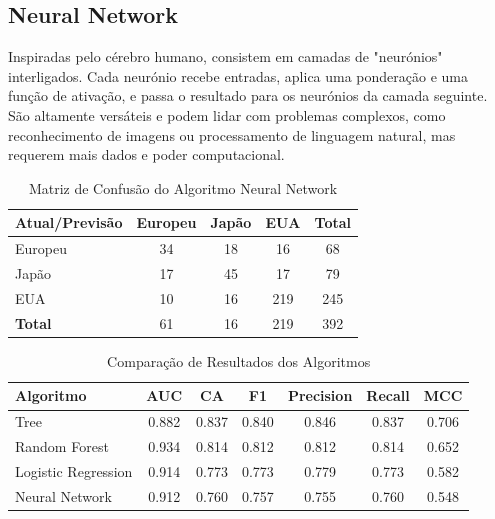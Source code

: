 \documentclass[conference]{IEEEtran}
\begin{document}
\subsection{Neural Network}
Inspiradas pelo cérebro humano, consistem em camadas de "neurónios" interligados. Cada neurónio recebe entradas, 
aplica uma ponderação e uma função de ativação, e passa o resultado para os neurónios da camada seguinte. São altamente versáteis 
e podem lidar com problemas complexos, como reconhecimento de imagens ou processamento de linguagem natural, mas requerem mais dados 
e poder computacional.

\begin{table}[h!]
    \centering
    \caption{Matriz de Confusão do Algoritmo Neural Network}
    \begin{tabular}{lcccc}
    \toprule
    \textbf{Atual/Previsão} & \textbf{Europeu} & \textbf{Japão} & \textbf{EUA} & \textbf{Total} \\
    \midrule
    Europeu & 34 & 18 & 16 & 68 \\
    Japão  & 17 & 45 & 17 & 79 \\
    EUA    & 10 & 16 & 219 & 245 \\
    \midrule
    \textbf{Total} & 61 & 16 & 219 & 392 \\
    \bottomrule
    \end{tabular}
    \label{tab:conf_matrix}
\end{table}

\newpage
\begin{table}[h!]
    \centering
    \caption{Comparação de Resultados dos Algoritmos}
    \begin{tabular}{lcccccc}
    \toprule
    \textbf{Algoritmo} & \textbf{AUC} & \textbf{CA} & \textbf{F1} & \textbf{Precision} & \textbf{Recall} & \textbf{MCC} \\
    \midrule
    Tree                & 0.882 & 0.837 & 0.840 & 0.846 & 0.837 & 0.706 \\
    Random Forest       & 0.934 & 0.814 & 0.812 & 0.812 & 0.814 & 0.652 \\
    Logistic Regression & 0.914 & 0.773 & 0.773 & 0.779 & 0.773 & 0.582 \\
    Neural Network      & 0.912 & 0.760 & 0.757 & 0.755 & 0.760 & 0.548 \\
    
    \bottomrule
    \end{tabular}
    \label{tab:evaluation_results}
\end{table}
\end{document}
